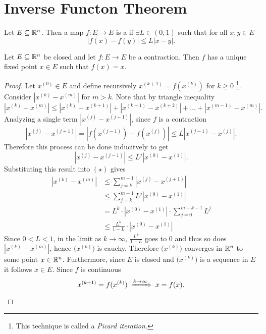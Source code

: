\documentclass[../main.tex]{subfiles}
\begin{document}
\section[Inverse Function Thm.]{Inverse Functon Theorem}

\begin{definition}[Contraction]
    Let $E \subseteq \mathbb{R}^n$. Then a map $f : E \to E$ is a  if $\exists L \in (0,1)$  such that for all $x,y \in E$
    \[
        |f(x) - f(y)| \leq L |x - y|
    .\]
\end{definition}

\begin{theorem}
    \label{thm:banachscontraction}
    Let $E \subseteq \mathbb{R}^n$ be closed and let $f : E \to E$ be a contraction. Then $f$ has a unique fixed point $x \in E$ such that $f(x) = x$.
\end{theorem}

\begin{proof}
    Let $x^{(0)} \in E$ and define recursively $x^{(k+1)} = f(x^{(k)})$ for $k \geq 0$ \footnote{This technique is called a \emph{Picard iteration.}}. Consider $|x^{(k)} - x^{(m)}|$ for $m > k$. Note that by triangle inequality
    \[
        |x^{(k)} - x^{(m)}| \leq |x^{(k)} - x^{(k+1)}| + |x^{(k+1)} - x^{(k+2)}| + \ldots + |x^{(m-1)} - x^{(m)}| \tag{\star}
    .\]
    Analyzing a single term $|x^{(j)} - x^{(j+1)}|$, since $f$ is a contraction
    \[
        |x^{(j)} - x^{(j+1)}| = |f(x^{(j-1)}) - f(x^{(j)})| \leq L |x^{(j-1)} - x^{(j)}|
    .\]
    Therefore this process can be done inducitvely to get
    \[
        |x^{(j)} - x^{(j-1)}| \leq L^j |x^{(0)} - x^{(1)}|
    .\]
    Substituting this result into $(\star)$ gives
    \begin{align*}
        |x^{(k)} - x^{(m)}| &\leq \sum_{j=k}^{m-1} |x^{(j)} - x^{(j+1)}| \\
                            &\leq \sum_{j=k}^{m-1} L^j |x^{(0)} - x^{(1)}| \\
                            &= L^k \cdot |x^{(0)} - x^{(1)}| \cdot \sum_{j=0}^{m - k - 1} L^j \\
                            &\leq \frac{L^k}{1 - L} \cdot |x^{(0)} - x^{(1)}|
    \end{align*}
    Since $0 < L < 1$, in the limit as $k \to \infty$, $\frac{L^k}{1 - L}$ goes to $0$ and thus so does $|x^{(k)} - x^{(m)}|$, hence $\bigl(x^{(k)}\bigr)$ is cauchy. Therefore $\bigl(x^{(k)}\bigr)$ converges in $\mathbb{R}^n$ to some point $x \in \mathbb{R}^n$. Furthermore, since $E$ is closed and $\bigl(x^{(k)}\bigr)$ is a sequence in $E$ it follows $x \in E$. Since $f$ is continuous
    \[
        x^{(k+1)} = f(x^{(k)}) \;\xRightarrow{k \to \infty}\; x = f(x)
    .\]
\end{proof}
\end{document}

